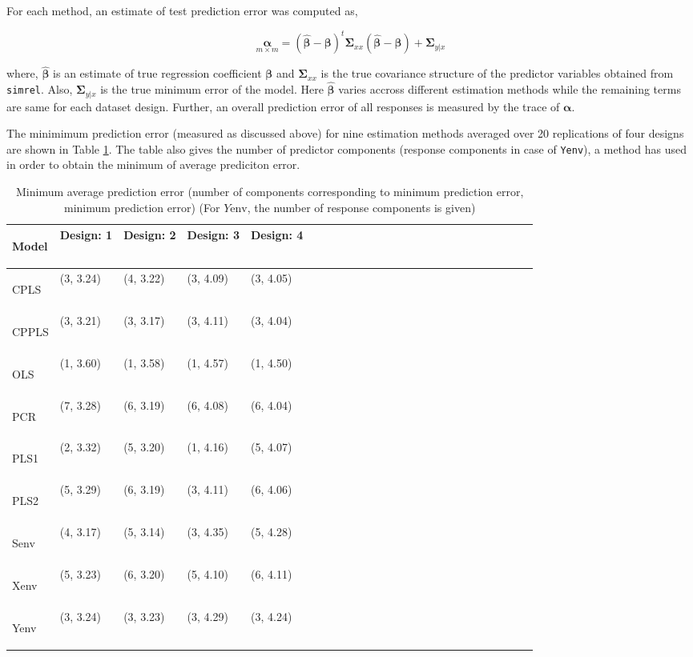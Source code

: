 \documentclass[3p,times,12pt,authoryear]{elsarticle}
\theoremstyle{definition}
\theoremstyle{definition}
\theoremstyle{remark}
\begin{document}
For each method, an estimate of test prediction error was computed as,

\[\underset{m \times m}{\boldsymbol{\alpha}} = 
\left(
\hat{\boldsymbol{\beta}} - \boldsymbol{\beta}
\right) ^t \boldsymbol{\Sigma}_{xx}
\left(
\hat{\boldsymbol{\beta}} - \boldsymbol{\beta}
\right) + \boldsymbol{\Sigma}_{y|x}\]

where, \(\hat{\boldsymbol{\beta}}\) is an estimate of true regression
coefficient \(\boldsymbol{\beta}\) and \(\boldsymbol{\Sigma}_{xx}\) is
the true covariance structure of the predictor variables obtained from
\texttt{simrel}. Also, \(\boldsymbol{\Sigma}_{y|x}\) is the true minimum
error of the model. Here \(\hat{\boldsymbol{\beta}}\) varies accross
different estimation methods while the remaining terms are same for each
dataset design. Further, an overall prediction error of all responses is
measured by the trace of \(\boldsymbol{\alpha}\).

The minimimum prediction error (measured as discussed above) for nine
estimation methods averaged over 20 replications of four designs are
shown in Table \ref{tab:min-error}. The table also gives the number of
predictor components (response components in case of \texttt{Yenv}), a
method has used in order to obtain the minimum of average prediciton
error.


\begin{table}

\caption{\label{tab:min-error}Minimum average prediction error 
      (number of components corresponding to minimum prediction error, minimum prediction error) 
      (For $Y\text{env}$, the number of response components is given)}
\centering
\begin{tabular}[t]{>{\bfseries\raggedright\arraybackslash}p{7em}>{\ttfamily\centering\arraybackslash}p{6em}>{\ttfamily\centering\arraybackslash}p{6em}>{\ttfamily\centering\arraybackslash}p{6em}>{\ttfamily\centering\arraybackslash}p{6em}lcccclcccclcccclcccc}
\toprule
\bfseries{Model} & \bfseries{Design: 1} & \bfseries{Design: 2} & \bfseries{Design: 3} & \bfseries{Design: 4}\\
\midrule
CPLS & (3, 3.24) & (4, 3.22) & (3, 4.09) & (3, 4.05)\\
CPPLS & (3, 3.21) & (3, 3.17) & (3, 4.11) & (3, 4.04)\\
OLS & (1, 3.60) & (1, 3.58) & (1, 4.57) & (1, 4.50)\\
PCR & (7, 3.28) & (6, 3.19) & (6, 4.08) & (6, 4.04)\\
PLS1 & (2, 3.32) & (5, 3.20) & (1, 4.16) & (5, 4.07)\\
\addlinespace
PLS2 & (5, 3.29) & (6, 3.19) & (3, 4.11) & (6, 4.06)\\
Senv & (4, 3.17) & (5, 3.14) & (3, 4.35) & (5, 4.28)\\
Xenv & (5, 3.23) & (6, 3.20) & (5, 4.10) & (6, 4.11)\\
Yenv & (3, 3.24) & (3, 3.23) & (3, 4.29) & (3, 4.24)\\
\bottomrule
\end{tabular}
\end{table}
\end{document}

